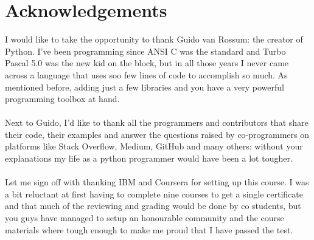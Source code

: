 \section{Acknowledgements}
I would like to take the opportunity to thank Guido van Rossum: the creator of Python. I've been programming since ANSI C was the standard and Turbo Pascal 5.0 was the new kid on the block, but in all those years I never came across a language that uses soo few lines of code to accomplish so much. As mentioned before, adding just a few libraries and you have a very powerful programming toolbox at hand.
\\\\
Next to Guido, I'd like to thank all the programmers and contributors that share their code, their examples and answer the questions raised by co-programmers on platforms like Stack Overflow, Medium, GitHub and many others: without your explanations my life as a python programmer would have been a lot tougher.
\\\\
Let me sign off with thanking IBM and Coursera for setting up this course. I was a bit reluctant at first having to complete nine courses to get a single certificate and that much of the reviewing and grading would be done by co students, but you guys have managed to setup an honourable community and the course materials where tough enough to make me proud that I have passed the test.